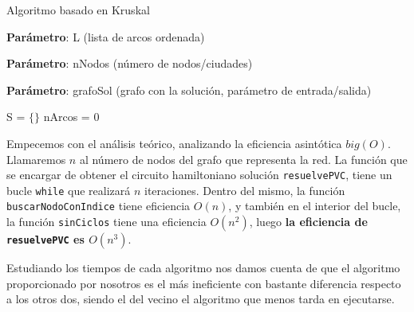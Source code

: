 \begin{algorithm}
	\caption{Algoritmo basado en Kruskal}\label{alg:bas_kruscal}
	\begin{minipage}{0.92\textwidth}
		\textbf{Parámetro}: L (lista de arcos ordenada)
		
		\textbf{Parámetro}: nNodos (número de nodos/ciudades)
		
		\textbf{Parámetro}: grafoSol (grafo con la solución, parámetro de entrada/salida)
	\end{minipage}

  S = $\{\}$\;
  nArcos = 0\;
  

\end{algorithm}




Empecemos con el análisis teórico, analizando la eficiencia asintótica $big(O)$. Llamaremos $n$ al número 
de nodos del grafo que representa la red. La función que se encargar de obtener el circuito hamiltoniano 
solución \texttt{resuelvePVC}, tiene un bucle \texttt{while} que realizará $n$ iteraciones. Dentro del mismo, 
la función \texttt{buscarNodoConIndice} tiene eficiencia $O(n)$, y también en el interior del bucle, la 
función \texttt{sinCiclos} tiene una eficiencia $O(n^2)$, luego \textbf{la eficiencia de \texttt{resuelvePVC} es $O(n^3)$}.


Estudiando los tiempos de cada algoritmo nos damos cuenta de que el algoritmo proporcionado por nosotros es el más ineficiente
con bastante diferencia respecto a los otros dos, siendo el del vecino el algoritmo que menos tarda en ejecutarse.

